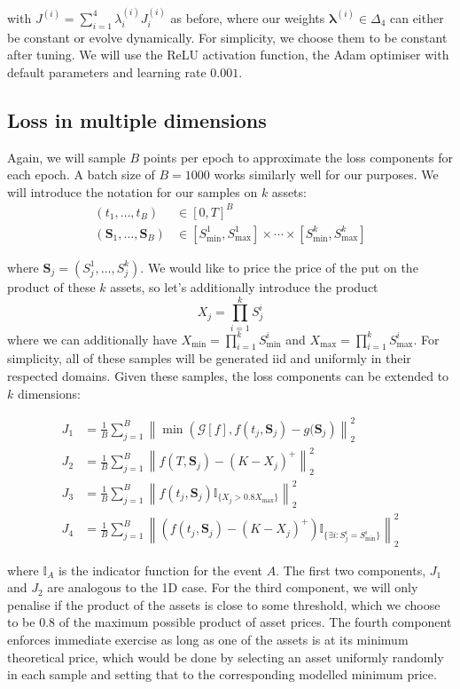 with $J^{(i)} = \sum_{i=1}^4 \lambda_i^{(i)} J_i^{(i)}$ as before, where our weights $\bm \lambda^{(i)} \in \Delta_4$ can either be constant or evolve dynamically. For simplicity, we choose them to be constant after tuning. We will use the ReLU activation function, the Adam optimiser with default parameters and learning rate $0.001$.

\subsection{Loss in multiple dimensions}

Again, we will sample $B$ points per epoch to approximate the loss components for each epoch. A batch size of $B=1000$ works similarly well for our purposes. We will introduce the notation for our samples on $k$ assets:
\begin{align*}
    (t_1, \dots, t_B) &\in [0, T]^B\\
    (\bm S_1, \dots, \bm S_B) &\in [S^1_\text{min}, S^1_\text{max}]\times \cdots \times [S^k_\text{min}, S^k_\text{max}]
\end{align*}

where $\bm S_j = (S_j^1, \dots, S_j^k)$. We would like to price the price of the put on the product of these $k$ assets, so let's additionally introduce the product
\[X_j = \prod_{i=1}^k S_j^i\]
where we can additionally have $X_\text{min} = \prod_{i=1}^k S_\text{min}^i$ and $X_\text{max} = \prod_{i=1}^k S_\text{max}^i$.
For simplicity, all of these samples will be generated iid and uniformly in their respected domains. Given these samples, the loss components can be extended to $k$ dimensions:

\begin{align*}
    J_1 &= \frac{1}{B} \sum_{j=1}^B \left\| \min \left(\mathcal G[f], f(t_j, \bm S_j) - g(\bm S_j\right)\right\|_2^2 \\
    J_2 &= \frac 1B \sum_{j=1}^B \left\| f(T, \bm S_j) - (K - X_j)^+\right\|_2^2 \\
    J_3 &= \frac 1B \sum_{j=1}^B \left\| 
    f(t_j, \bm S_j) \mathbb I_{\{X_j > 0.8X_\text{max}\}} \right\|_2^2 \\
    J_4 &= \frac 1B \sum_{j=1}^B \left\|\left( f(t_j, \bm S_j) - (K - X_j)^+\right)\mathbb I_{\{\exists i : S^i_j = S^i_\text{min}\}}\right\|_2^2
\end{align*}

where $\mathbb I_{A}$ is the indicator function for the event $A$. The first two components, $J_1$ and $J_2$ are analogous to the 1D case. For the third component, we will only penalise if the product of the assets is close to some threshold, which we choose to be $0.8$ of the maximum possible product of asset prices. The fourth component enforces immediate exercise as long as one of the assets is at its minimum theoretical price, which would be done by selecting an asset uniformly randomly in each sample and setting that to the corresponding modelled minimum price.

